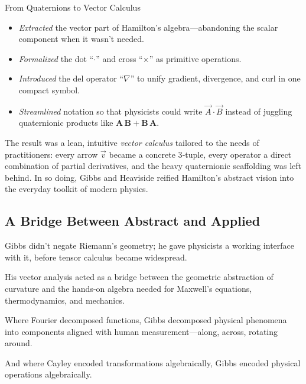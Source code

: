 \begin{HistoricalSidebar}{From Quaternions to Vector Calculus}
    \begin{itemize}
      \item \emph{Extracted} the vector part of Hamilton’s algebra—abandoning the scalar component when it wasn’t needed.
      \item \emph{Formalized} the dot “\(\cdot\)” and cross “\(\times\)” as primitive operations.
      \item \emph{Introduced} the del operator “\(\nabla\)” to unify gradient, divergence, and curl in one compact symbol.
      \item \emph{Streamlined} notation so that physicists could write \(\vec A \cdot \vec B\) instead of juggling quaternionic products like \(\mathbf A\,\mathbf B + \mathbf B\,\mathbf A\).
    \end{itemize}

    \medskip
    
    The result was a lean, intuitive \emph{vector calculus} tailored to the needs of practitioners: every arrow \(\vec v\) became a concrete 3‐tuple, every operator a direct combination of partial derivatives, and the heavy quaternionic scaffolding was left behind.  In so doing, Gibbs and Heaviside reified Hamilton’s abstract vision into the everyday toolkit of modern physics.
    
\end{HistoricalSidebar}
    


\medskip




\bigskip

\subsection*{A Bridge Between Abstract and Applied}

Gibbs didn’t negate Riemann’s geometry; he gave physicists a working interface with it,  
before tensor calculus became widespread.

His vector analysis acted as a bridge between the geometric abstraction of curvature  
and the hands-on algebra needed for Maxwell’s equations, thermodynamics, and mechanics.

Where Fourier decomposed functions, Gibbs decomposed physical phenomena into components aligned with human measurement—along, across, rotating around.

And where Cayley encoded transformations algebraically, Gibbs encoded physical operations algebraically.

